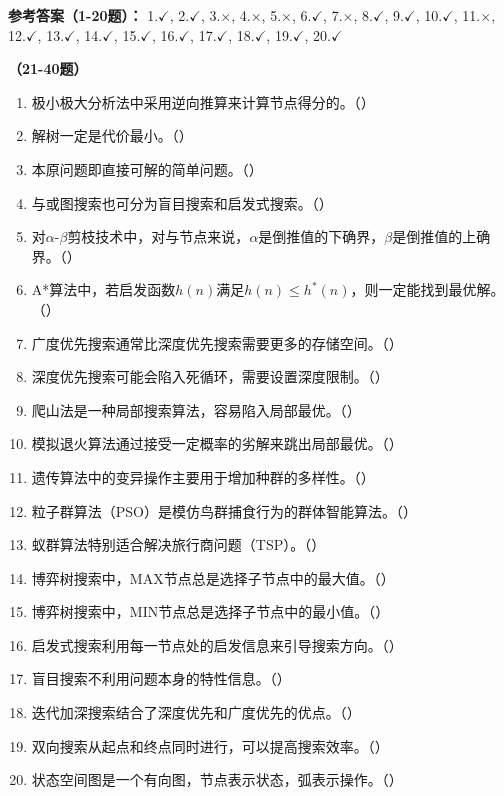 \textbf{参考答案（1-20题）：}
1.$\checkmark$, 2.$\checkmark$, 3.$\times$, 4.$\times$, 5.$\times$, 6.$\checkmark$, 7.$\times$, 8.$\checkmark$, 9.$\checkmark$, 10.$\checkmark$, 
11.$\times$, 12.$\checkmark$, 13.$\checkmark$, 14.$\checkmark$, 15.$\checkmark$, 16.$\checkmark$, 17.$\checkmark$, 18.$\checkmark$, 19.$\checkmark$, 20.$\checkmark$

\vspace{1em}
\textbf{（21-40题）}
\begin{enumerate}[resume,leftmargin=2em,itemsep=1pt]
\item 极小极大分析法中采用逆向推算来计算节点得分的。（\quad）
\item 解树一定是代价最小。（\quad）
\item 本原问题即直接可解的简单问题。（\quad）
\item 与或图搜索也可分为盲目搜索和启发式搜索。（\quad）
\item 对$\alpha$-$\beta$剪枝技术中，对与节点来说，$\alpha$是倒推值的下确界，$\beta$是倒推值的上确界。（\quad）
\item A*算法中，若启发函数$h(n)$满足$h(n) \leq h^*(n)$，则一定能找到最优解。（\quad）
\item 广度优先搜索通常比深度优先搜索需要更多的存储空间。（\quad）
\item 深度优先搜索可能会陷入死循环，需要设置深度限制。（\quad）
\item 爬山法是一种局部搜索算法，容易陷入局部最优。（\quad）
\item 模拟退火算法通过接受一定概率的劣解来跳出局部最优。（\quad）
\item 遗传算法中的变异操作主要用于增加种群的多样性。（\quad）
\item 粒子群算法（PSO）是模仿鸟群捕食行为的群体智能算法。（\quad）
\item 蚁群算法特别适合解决旅行商问题（TSP）。（\quad）
\item 博弈树搜索中，MAX节点总是选择子节点中的最大值。（\quad）
\item 博弈树搜索中，MIN节点总是选择子节点中的最小值。（\quad）
\item 启发式搜索利用每一节点处的启发信息来引导搜索方向。（\quad）
\item 盲目搜索不利用问题本身的特性信息。（\quad）
\item 迭代加深搜索结合了深度优先和广度优先的优点。（\quad）
\item 双向搜索从起点和终点同时进行，可以提高搜索效率。（\quad）
\item 状态空间图是一个有向图，节点表示状态，弧表示操作。（\quad）
\end{enumerate}

